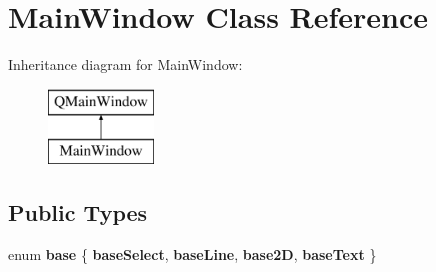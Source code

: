 \hypertarget{classMainWindow}{\section{Main\-Window Class Reference}
\label{classMainWindow}
}
Inheritance diagram for Main\-Window\-:\begin{figure}[H]
\begin{center}
\leavevmode
\includegraphics[height=2.000000cm]{classMainWindow}
\end{center}
\end{figure}
\subsection*{Public Types}
\begin{DoxyCompactItemize}
\item 
enum {\bfseries base} \{ {\bfseries base\-Select}, 
{\bfseries base\-Line}, 
{\bfseries base2\-D}, 
{\bfseries base\-Text}
 \}
\end{DoxyCompactItemize}
